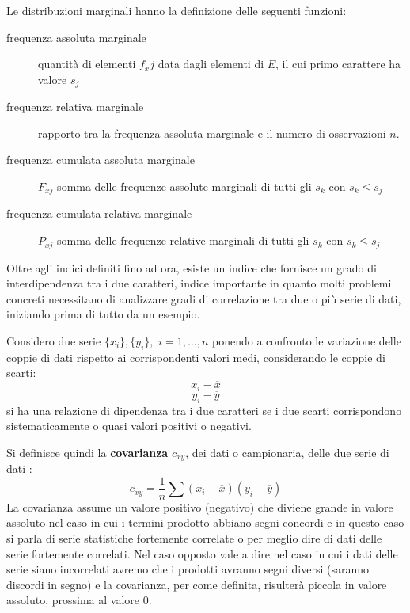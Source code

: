 \documentclass[a4paper,12pt, oneside]{book}
\begin{document}
Le distribuzioni marginali hanno la definizione delle seguenti funzioni:
\begin{description}
    \item [frequenza assoluta marginale] quantità di elementi $f_xj$ data dagli elementi di $E$, il cui primo carattere ha valore $s_j$
    \item [frequenza relativa marginale] rapporto tra la frequenza assoluta marginale e il numero di osservazioni $n$.
    \item [frequenza cumulata assoluta marginale] $F_{xj}$ somma delle frequenze assolute marginali di tutti gli $s_k$ con $s_k \leq s_j$
    \item [frequenza cumulata relativa marginale] $P_{xj}$ somma delle frequenze relative marginali di tutti gli $s_k$ con $s_k \leq s_j$
\end{description}
Oltre agli indici definiti fino ad ora, esiste un indice che fornisce un grado di interdipendenza tra i due caratteri,
indice importante in quanto molti problemi concreti necessitano di analizzare gradi di correlazione tra due o più serie di dati,
iniziando prima di tutto da un esempio.

Considero due serie $\{x_i\},\{y_i\},\,\,i=1,...,n$ ponendo a confronto le variazione delle coppie di dati
rispetto ai corrispondenti valori medi, considerando le coppie di scarti:
\[ x_i - \overline{x} \]
\[ y_i - \overline{y} \]
si ha una relazione di dipendenza tra i due caratteri se i due scarti corrispondono sistematicamente o quasi valori positivi o negativi.

Si definisce quindi la \textbf{covarianza} $c_{xy}$, dei dati o campionaria, delle due serie di dati :
\[ c_{xy} = \frac{1}{n} \sum (x_i - \overline{x}) (y_i - \overline{y}) \]
La covarianza assume un valore positivo (negativo) che diviene grande in valore assoluto nel caso in cui 
i termini prodotto abbiano segni concordi e in questo caso si parla di serie statistiche fortemente correlate
o per meglio dire di dati delle serie fortemente correlati.\newline
Nel caso opposto vale a dire nel caso in cui i dati delle serie siano incorrelati avremo che i prodotti
avranno segni diversi (saranno discordi in segno) e la covarianza, per come definita,
risulterà piccola in valore assoluto, prossima al valore 0.
\end{document}
